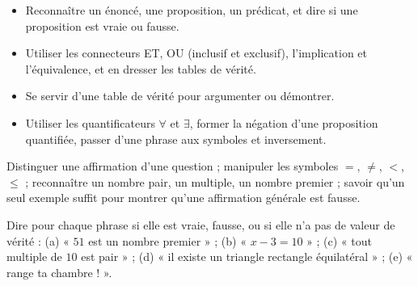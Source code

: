 \begin{objectives}
\begin{itemize}
\item Reconnaître un énoncé, une proposition, un prédicat, et dire si une proposition est vraie ou fausse.
\item Utiliser les connecteurs ET, OU (inclusif et exclusif), l'implication et l'équivalence, et en dresser les tables de vérité.
\item Se servir d'une table de vérité pour argumenter ou démontrer.
\item Utiliser les quantificateurs $\forall$ et $\exists$, former la négation d'une proposition quantifiée, passer d'une phrase aux symboles et inversement.
\end{itemize}
\end{objectives}
\begin{prerequisites}
Distinguer une affirmation d'une question ; manipuler les symboles $=$, $\ne$, $<$, $\le$ ; reconnaître un nombre pair, un multiple, un nombre premier ; savoir qu'un seul exemple suffit pour montrer qu'une affirmation générale est fausse.
\end{prerequisites}
\begin{fluency}[5 min]
Dire pour chaque phrase si elle est vraie, fausse, ou si elle n'a pas de valeur de vérité : (a) « $51$ est un nombre premier » ; (b) « $x-3=10$ » ; (c) « tout multiple de $10$ est pair » ; (d) « il existe un triangle rectangle équilatéral » ; (e) « range ta chambre ! ».
\end{fluency}

